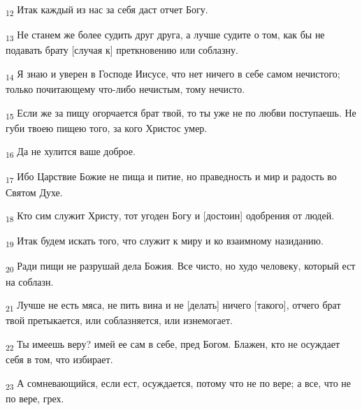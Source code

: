 \begin{tcolorbox}
\textsubscript{12} Итак каждый из нас за себя даст отчет Богу.
\end{tcolorbox}
\begin{tcolorbox}
\textsubscript{13} Не станем же более судить друг друга, а лучше судите о том, как бы не подавать брату [случая к] преткновению или соблазну.
\end{tcolorbox}
\begin{tcolorbox}
\textsubscript{14} Я знаю и уверен в Господе Иисусе, что нет ничего в себе самом нечистого; только почитающему что-либо нечистым, тому нечисто.
\end{tcolorbox}
\begin{tcolorbox}
\textsubscript{15} Если же за пищу огорчается брат твой, то ты уже не по любви поступаешь. Не губи твоею пищею того, за кого Христос умер.
\end{tcolorbox}
\begin{tcolorbox}
\textsubscript{16} Да не хулится ваше доброе.
\end{tcolorbox}
\begin{tcolorbox}
\textsubscript{17} Ибо Царствие Божие не пища и питие, но праведность и мир и радость во Святом Духе.
\end{tcolorbox}
\begin{tcolorbox}
\textsubscript{18} Кто сим служит Христу, тот угоден Богу и [достоин] одобрения от людей.
\end{tcolorbox}
\begin{tcolorbox}
\textsubscript{19} Итак будем искать того, что служит к миру и ко взаимному назиданию.
\end{tcolorbox}
\begin{tcolorbox}
\textsubscript{20} Ради пищи не разрушай дела Божия. Все чисто, но худо человеку, который ест на соблазн.
\end{tcolorbox}
\begin{tcolorbox}
\textsubscript{21} Лучше не есть мяса, не пить вина и не [делать] ничего [такого], отчего брат твой претыкается, или соблазняется, или изнемогает.
\end{tcolorbox}
\begin{tcolorbox}
\textsubscript{22} Ты имеешь веру? имей ее сам в себе, пред Богом. Блажен, кто не осуждает себя в том, что избирает.
\end{tcolorbox}
\begin{tcolorbox}
\textsubscript{23} А сомневающийся, если ест, осуждается, потому что не по вере; а все, что не по вере, грех.
\end{tcolorbox}
